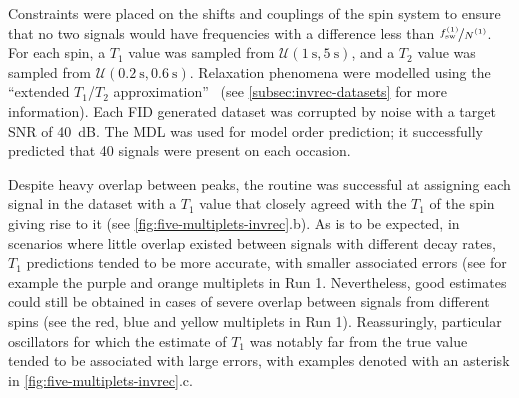 Constraints were placed on the shifts and
couplings of the spin system to ensure that no two signals would have
frequencies with a difference less than $\nicefrac{\fswone}{\None}$.
For each spin, a $T_1$ value was sampled from $\mathcal{U}(\qty{1}{\second},
\qty{5}{\second})$, and a $T_2$ value was sampled from
$\mathcal{U}(\qty{0.2}{\second}, \qty{0.6}{\second})$.
Relaxation phenomena were modelled using the ``extended $T_1$/$T_2$
approximation''~\cite{SpinachRelax} (see \cref{subsec:invrec-datasets} for more
information).
Each \ac{FID} generated dataset was corrupted by noise with a target
\ac{SNR} of \qty{40}{\deci\bel}. The \ac{MDL} was used for model order
prediction; it successfully predicted that 40 signals were present on each
occasion.

Despite heavy overlap between peaks, the routine was successful at
assigning each signal in the dataset with a $T_1$ value that closely agreed
with the $T_1$ of the spin giving rise to it (see
\cref{fig:five-multiplets-invrec}.b). As is to be
expected, in scenarios where little overlap existed between signals with
different decay rates, $T_1$ predictions tended to be more accurate, with
smaller associated errors (see for example the purple and orange multiplets in Run 1.
Nevertheless, good estimates could still be obtained in cases of severe
overlap between signals from different spins (see the red, blue and yellow
multiplets in Run 1). Reassuringly, particular oscillators for which the
estimate of $T_1$ was notably far from the true value tended to be associated
with large errors, with examples denoted with an asterisk in
\cref{fig:five-multiplets-invrec}.c.


